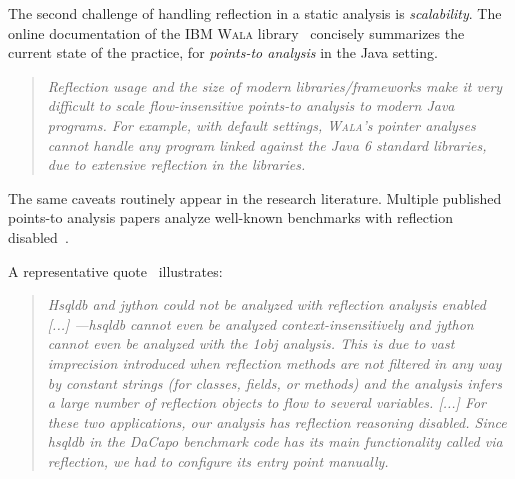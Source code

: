 



The second challenge of handling reflection in a static analysis is
\emph{scalability}.  The online documentation of the IBM \textsc{Wala}
library~\cite{www:wala-reflection} concisely summarizes the current
state of the practice, for \emph{points-to analysis} in the Java
setting.

\begin{quote}
  \emph{Reflection usage and the size of modern libraries/frameworks
    make it very difficult to scale flow-insensitive points-to
    analysis to modern Java programs. For example, with default
    settings, \textsc{Wala}'s pointer analyses cannot handle any
    program linked against the Java 6 standard libraries, due to
    extensive reflection in the libraries.}
\end{quote}

\noindent The same caveats routinely appear in the research
literature. Multiple published points-to analysis papers analyze
well-known benchmarks with reflection
disabled~\cite{popl/SmaragdakisBL11,pldi/KastrinisS13,ecoop/AliL12,ecoop/AliL13}.


A representative quote~\cite{popl/SmaragdakisBL11} illustrates:
\begin{quote}
  \emph{Hsqldb and jython could not be analyzed with reflection
    analysis enabled [...]  ---hsqldb cannot even be analyzed
    context-insensitively and jython cannot even be analyzed with the
    1obj analysis. This is due to vast imprecision introduced when
    reflection methods are not filtered in any way by constant strings
    (for classes, fields, or methods) and the analysis infers a large
    number of reflection objects to flow to several variables.  [...]
    For these two applications, our analysis has reflection reasoning
    disabled.  Since hsqldb in the DaCapo benchmark code has its main
    functionality called via reflection, we had to configure its entry
    point manually.}
\end{quote}

